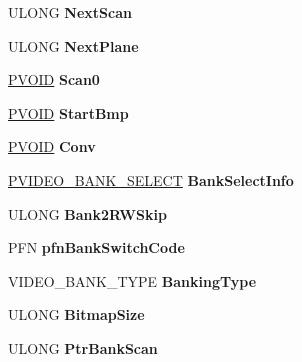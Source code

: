 \begin{DoxyCompactItemize}
U\+L\+O\+NG {\bfseries Next\+Scan}
\item 
\mbox{\label{struct___d_e_v_s_u_r_f_a8b41b6f615e40b5e15bef8e89880ef51}} 
U\+L\+O\+NG {\bfseries Next\+Plane}
\item 
\mbox{\label{struct___d_e_v_s_u_r_f_a86b560d4b5f95e0ad695624417c5ec63}} 
\hyperlink{interfacevoid}{P\+V\+O\+ID} {\bfseries Scan0}
\item 
\mbox{\label{struct___d_e_v_s_u_r_f_a6aa9a3837e120e3125a5032866a8a4e7}} 
\hyperlink{interfacevoid}{P\+V\+O\+ID} {\bfseries Start\+Bmp}
\item 
\mbox{\label{struct___d_e_v_s_u_r_f_ac140a05b8d5c3c5563f6acdc32bc5ac5}} 
\hyperlink{interfacevoid}{P\+V\+O\+ID} {\bfseries Conv}
\item 
\mbox{\label{struct___d_e_v_s_u_r_f_a9b95283a4bffee40c282e7d8cbe7c915}} 
\hyperlink{struct___v_i_d_e_o___b_a_n_k___s_e_l_e_c_t}{P\+V\+I\+D\+E\+O\+\_\+\+B\+A\+N\+K\+\_\+\+S\+E\+L\+E\+CT} {\bfseries Bank\+Select\+Info}
\item 
\mbox{\label{struct___d_e_v_s_u_r_f_a3b18a552393ffafa0fd71ed49b945377}} 
U\+L\+O\+NG {\bfseries Bank2\+R\+W\+Skip}
\item 
\mbox{\label{struct___d_e_v_s_u_r_f_af2c35e3afcd22cc9ac814a62c988ac1f}} 
P\+FN {\bfseries pfn\+Bank\+Switch\+Code}
\item 
\mbox{\label{struct___d_e_v_s_u_r_f_a95d432f93f081faf6c30b6045c17ed05}} 
V\+I\+D\+E\+O\+\_\+\+B\+A\+N\+K\+\_\+\+T\+Y\+PE {\bfseries Banking\+Type}
\item 
\mbox{\label{struct___d_e_v_s_u_r_f_a167df1e05ec4d7685d0ce1b85db07f33}} 
U\+L\+O\+NG {\bfseries Bitmap\+Size}
\item 
\mbox{\label{struct___d_e_v_s_u_r_f_a3e4eef1b8283bd2c9480dbcbde0d1a8c}} 
U\+L\+O\+NG {\bfseries Ptr\+Bank\+Scan}
\item 
\mbox{\label{struct___d_e_v_s_u_r_f_a3e6bf8b683fe26d5341f3a29de2f2e04}} 

\end{DoxyCompactItemize}
